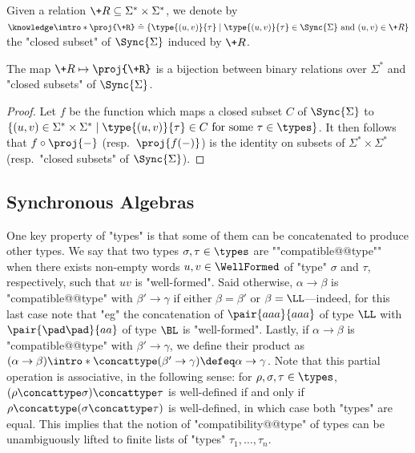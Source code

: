 
Given a relation $\+R \subseteq \Sigma^* \times \Sigma^*$, we denote by
$\AP\intro*\proj{\+R} \defeq \{\type{(u,v)}{\tau} \mid \type{(u,v)}{\tau} \in \Sync{\Sigma} \text{ and } (u,v) \in \+R\}$
the "closed subset" of $\Sync{\Sigma}$ induced by $\+R$.

\begin{fact}
	The map $\+R \mapsto \proj{\+R}$ is a bijection between
	binary relations over $\Sigma^*$ and "closed subsets" of $\Sync{\Sigma}$.
\end{fact}

\begin{proof}
	Let $f$ be the function which maps a closed subset $C$ of $\Sync{\Sigma}$ to
	$\{(u,v) \in \Sigma^* \times \Sigma^* \mid \type{(u,v)}{\tau} \in C \text{ for some $\tau \in \types$} \}$. It then follows that $f\circ \proj{-}$ (resp.~$\proj{f(-)}$) is the identity
	on subsets of $\Sigma^* \times \Sigma^*$ (resp.~"closed subsets" of $\Sync{\Sigma}$).
\end{proof}

\subsection{Synchronous Algebras}

One key property of "types" is that some of them can be concatenated to produce other types.
We say that two types $\sigma, \tau \in \types$ are \AP""compatible@@type""
when there exists non-empty words $u,v \in \WellFormed$ of "type" $\sigma$
and $\tau$, respectively, such that $uv$ is "well-formed".
Said otherwise, $\alpha \to \beta$ is "compatible@@type" with $\beta' \to \gamma$
if either $\beta = \beta'$ or $\beta = \LL$---indeed, for this last case
note that "eg" the concatenation of $\pair{aaa}{aaa}$ of type $\LL$ with
$\pair{\pad\pad}{aa}$ of type $\BL$ is "well-formed".
Lastly, if $\alpha\to \beta$ is "compatible@@type" with $\beta'\to\gamma$,
we define their product as \AP $(\alpha\to\beta)\intro*\concattype(\beta'\to\gamma) \defeq \alpha \to \gamma$.
Note that this partial operation is associative, in the following sense: for $\rho,\sigma,\tau \in \types$, $(\rho\concattype\sigma) \concattype \tau$ is well-defined if and only if
$\rho\concattype(\sigma\concattype \tau)$ is well-defined, in which case both "types" are equal.
This implies that the notion of "compatibility@@type" of types can be unambiguously
lifted to finite lists of "types" $\tau_1,\dotsc,\tau_n$.

